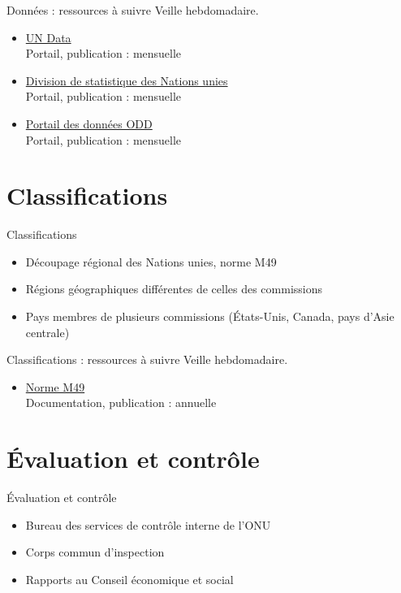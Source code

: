 \documentclass[aspectratio=169,11pt]{beamer}
\begin{document}
\begin{frame}{Données : ressources à suivre}
\small
Veille hebdomadaire.
\begin{itemize}
\item \href{https://data.un.org}{UN Data}\\{\footnotesize Portail, publication : mensuelle}
\item \href{https://unstats.un.org}{Division de statistique des Nations unies}\\{\footnotesize Portail, publication : mensuelle}
\item \href{https://unstats.un.org/sdgs}{Portail des données ODD}\\{\footnotesize Portail, publication : mensuelle}
\end{itemize}
\end{frame}

\section{Classifications}
\begin{frame}{Classifications}
\begin{itemize}
\item Découpage régional des Nations unies, norme M49
\item Régions géographiques différentes de celles des commissions
\item Pays membres de plusieurs commissions (États-Unis, Canada, pays d'Asie centrale)
\end{itemize}
\end{frame}

\begin{frame}{Classifications : ressources à suivre}
\small
Veille hebdomadaire.
\begin{itemize}
\item \href{https://unstats.un.org/unsd/methodology/m49/}{Norme M49}\\{\footnotesize Documentation, publication : annuelle}
\end{itemize}
\end{frame}

\section{Évaluation et contrôle}
\begin{frame}{Évaluation et contrôle}
\begin{itemize}
\item Bureau des services de contrôle interne de l'ONU
\item Corps commun d'inspection
\item Rapports au Conseil économique et social
\end{itemize}
\end{frame}
\end{document}
